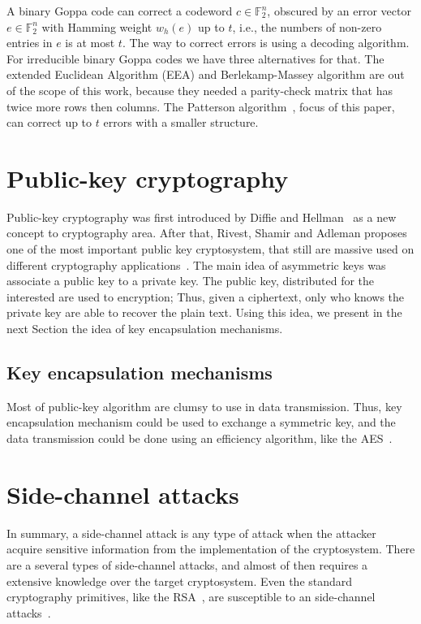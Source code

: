 A binary Goppa code can correct a codeword $c \in \mathbb{F}_{2}^n$, obscured by an error vector $e \in \mathbb{F}_{2}^n$ with Hamming weight $w_h(e)$ up to $t$, i.e., the numbers of non-zero entries in $e$ is at most $t$. The way to correct errors is using a decoding algorithm. For irreducible binary Goppa codes we have three alternatives for that. The extended Euclidean Algorithm (EEA) and Berlekamp-Massey algorithm are out of the scope of this work, because they needed a parity-check matrix that has twice more rows then columns. The Patterson algorithm~\cite{patterson1975algebraic}, focus of this paper, can correct up to $t$ errors with a smaller structure.

\section{Public-key cryptography}
Public-key cryptography was first introduced by Diffie and Hellman~\cite{diffie1976new} as a new concept to cryptography area. After that, Rivest, Shamir and Adleman proposes one of the most important public key cryptosystem, that still are massive used on different cryptography applications~\cite{rivest1978method}. The main idea of asymmetric keys was associate a public key to a private key. The public key, distributed for the interested are used to encryption; Thus, given a ciphertext, only who knows the private key are able to recover the plain text. Using this idea, we present in the next Section the idea of key encapsulation mechanisms.

\subsection{Key encapsulation mechanisms}
Most of public-key algorithm are clumsy to use in data transmission. Thus, key encapsulation mechanism could be used to exchange a symmetric key, and the data transmission could be done using an efficiency algorithm, like the AES~\cite{daemen2013design}.

\section{Side-channel attacks}
In summary, a side-channel attack is any type of attack when the attacker acquire sensitive information from the implementation of the cryptosystem. There are a several types of side-channel attacks, and almost of then requires a extensive knowledge over the target cryptosystem. Even the standard cryptography primitives, like the RSA~\cite{rivest1978method}, are susceptible to an side-channel attacks~\cite{kocher1996timing}. 

